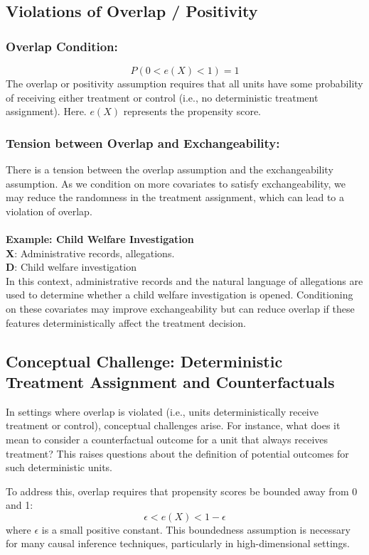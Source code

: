 \subsection{Violations of Overlap / Positivity}
\subsubsection{Overlap Condition:}
$$P(0 < e(X) < 1) = 1$$
The overlap or positivity assumption requires that all units have some probability of receiving either treatment or control (i.e., no deterministic treatment assignment). Here. $e(X)$ represents the propensity score.

\subsubsection{Tension between Overlap and Exchangeability:}
There is a tension between the overlap assumption and the exchangeability assumption. As we condition on more covariates to satisfy exchangeability, we may reduce the randomness in the treatment assignment, which can lead to a violation of overlap. \\
\\
\textbf{Example:  Child Welfare Investigation} \\
\textbf{X}: Administrative records, allegations. \\
\textbf{D}: Child welfare investigation \\

In this context, administrative records and the natural language of allegations are used to determine whether a child welfare investigation is opened. Conditioning on these covariates may improve exchangeability but can reduce overlap if these features deterministically affect the treatment decision.


\subsection{Conceptual Challenge: Deterministic Treatment Assignment and Counterfactuals}

In settings where overlap is violated (i.e., units deterministically receive treatment or control), conceptual challenges arise. For instance, what does it mean to consider a counterfactual outcome for a unit that always receives treatment? This raises questions about the definition of potential outcomes for such deterministic units.

To address this, overlap requires that propensity scores be bounded away from 0 and 1:
$$\epsilon < e(X) < 1 - \epsilon$$
where $\epsilon$ is a small positive constant. This boundedness assumption is necessary for many causal inference techniques, particularly in high-dimensional settings.

